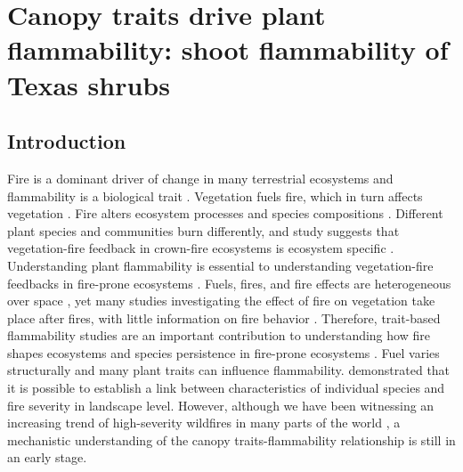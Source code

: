 \documentclass{ttuthes2007}
\begin{document}
\linenumbers
\renewcommand{\linenumberfont}{\normalfont\bfseries\large\color{black}}

\chapter{Canopy traits drive plant flammability: shoot flammability of Texas shrubs}

\section{Introduction}

Fire is a dominant driver of change in many terrestrial ecosystems and flammability is a biological trait \citep{pausas2012flammability}. Vegetation fuels fire, which in turn affects vegetation \citep{bova2005linking, jones2006prediction, kavanagh2010way,o2010acute, michaletz2012moving, west2016experimental, lodge2018xylem, bar2019fire}. Fire alters ecosystem processes \citep{debano1978effect, debano1998fire, grogan2000fire,wan2001fire, keane2008ecological, roces2022global,ojima1994long} and species compositions \citep{cochrane2003fire,cleary2004changes, laurance2003slow}. Different plant species and communities burn differently, and study suggests that vegetation-fire feedback in crown-fire ecosystems is ecosystem specific \citep{pausas2004plant}. 
Understanding plant flammability is essential to understanding vegetation-fire feedbacks in fire-prone ecosystems \citep{pausas2012fire, pausas2017flammability}. Fuels, fires, and fire effects are heterogeneous over space \citep{gagnon2010does}, yet many studies investigating the effect of fire on vegetation take place after fires, with little information on fire behavior \citep{o2018advances}. Therefore, trait-based flammability studies are an important contribution to understanding how fire shapes ecosystems and species persistence in fire-prone ecosystems \citep{pausas2012fire, pausas2017flammability}. Fuel varies structurally and many plant traits can influence flammability. \citet{schwilk2011scaling} demonstrated that it is possible to establish a link between characteristics of individual species  and fire severity in landscape level. However, although we have been witnessing an increasing trend of high-severity wildfires in many parts of the world \citep{miller2012trends, dennison2014large, weber2020spatiotemporal, salguero2020wildfire}, a mechanistic understanding of the canopy traits-flammability relationship is still in an early stage.
\end{document}
